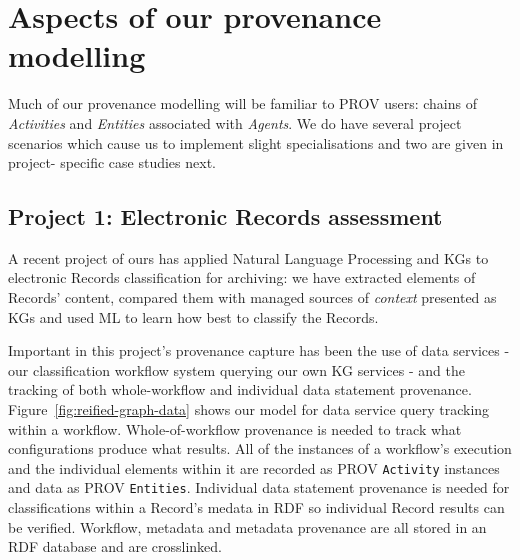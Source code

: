 \documentclass[letterpaper,twocolumn,10pt]{article}
\begin{document}
\section{Aspects of our provenance modelling}
Much of our provenance modelling will be familiar to PROV users: chains of \textit{Activities} and \textit{Entities} associated with 
\textit{Agents}. We do have several project scenarios which cause us to implement slight specialisations and two are given in project-
specific case studies next.

\subsection{Project 1: Electronic Records assessment}
A recent project of ours has applied Natural Language Processing and KGs to electronic Records classification for archiving: we have extracted elements of Records' content, compared them with managed sources of \textit{context} presented as KGs and used ML to learn
how best to classify the Records.

Important in this project's provenance capture has been the use of data services - our classification workflow system querying our own
KG services - and the tracking of both whole-workflow and individual data statement provenance. Figure~\ref{fig:reified-graph-data} shows our 
model for data service query tracking within a workflow. Whole-of-workflow provenance is needed to track what configurations produce what 
results. All of the instances of a workflow's execution and the individual elements within it are recorded as PROV \texttt{Activity} instances
and data as PROV \texttt{Entities}.  
Individual data statement provenance is needed for classifications within a Record's medata in RDF so individual Record results can 
be verified. Workflow, metadata and metadata provenance are all stored in an RDF database and are crosslinked.
\end{document}
